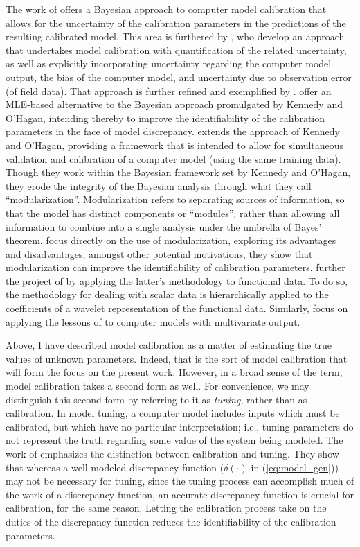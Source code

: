 \documentclass{article}
\begin{document}
The work of \cite{Kennedy2001} offers a Bayesian approach to computer model calibration that allows for the uncertainty of the calibration parameters in the predictions of the resulting calibrated model. This area is furthered by \cite{Higdon2004}, who develop an approach that undertakes model calibration with quantification of the related uncertainty, as well as explicitly incorporating uncertainty regarding the computer model output, the bias of the computer model, and uncertainty due to observation error (of field data). That approach is further refined and exemplified by \cite{Williams2006}.
\cite{Loeppky2006} offer an MLE-based alternative to the Bayesian approach promulgated by Kennedy and O'Hagan, intending thereby to improve the identifiability of the calibration parameters in the face of model discrepancy. 
\cite{Bayarri2007} extends the approach of Kennedy and O'Hagan, providing a framework that is intended to allow for simultaneous validation and calibration of a computer model (using the same training data). Though they  work within the Bayesian framework set by Kennedy and O'Hagan, they erode the integrity of the Bayesian analysis through what they call ``modularization''. Modularization refers to separating sources of information, so that the model has distinct components or ``modules'', rather than allowing all information to combine into a single analysis under the umbrella of Bayes' theorem. \cite{Liu2009} focus directly on the use of modularization, exploring its advantages and disadvantages; amongst other potential motivations, they show that modularization can improve the identifiability of calibration parameters. 
\cite{Bayarri} further the project of \cite{Bayarri2007} by applying the latter's methodology to functional data. To do so, the methodology for dealing with scalar data is hierarchically applied to the coefficients of a wavelet representation of the functional data. Similarly, \cite{Paulo2012} focus on applying the lessons of \cite{Bayarri2007} to computer models with multivariate output.

Above, I have described model calibration as a matter of estimating the true values of unknown parameters. Indeed, that is the sort of model calibration that will form the focus on the present work. However, in a broad sense of the term, model calibration takes a second form as well. For convenience, we may distinguish this second form by referring to it as \emph{tuning}, rather than as calibration. In model tuning, a computer model includes inputs which must be calibrated, but which have no particular interpretation; i.e., tuning parameters do not represent the truth regarding some value of the system being modeled. The work of \cite{Brynjarsdottir2014} emphasizes the distinction between calibration and tuning. They show that whereas a well-modeled discrepancy function ($\delta(\cdot)$ in (\ref{eq:model_gen})) may not be necessary for tuning, since the tuning process can accomplish much of the work of a discrepancy function, an accurate discrepancy function is crucial for calibration, for the same reason. Letting the calibration process take on the duties of the discrepancy function reduces the identifiability of the calibration parameters.
\end{document}
